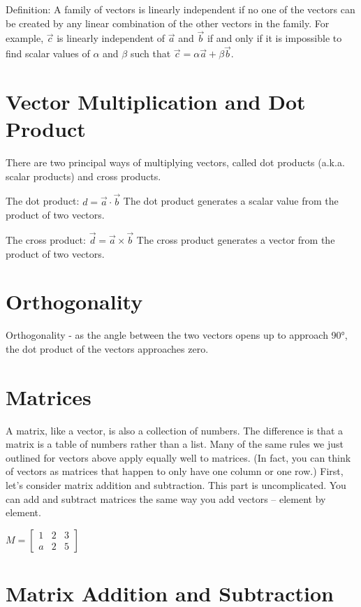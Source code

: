\documentclass{article}
\begin{document}
Definition: A family of vectors is linearly independent if no one of the vectors can be created by any linear combination of the other vectors in the family. For example, $\vec{c}$ is linearly independent of $\vec{a}$ and $\vec{b}$ if and only if it is impossible to find scalar values of $\alpha$ and $\beta$ such that $\vec{c} = \alpha\vec{a} + \beta\vec{b}$.

\section{Vector Multiplication and Dot Product}
There are two principal ways of multiplying vectors, called dot products (a.k.a. scalar products) and cross products.

The dot product: $d = \vec{a} \cdot \vec{b}$
The dot product generates a scalar value from the product of two vectors.

The cross product: $\vec{d} = \vec{a} \times \vec{b}$
The cross product generates a vector from the product of two vectors.

\section{Orthogonality}
Orthogonality - as the angle between the two vectors opens up to approach 90°, the dot product of the vectors approaches zero.

\section{Matrices} 
A matrix, like a vector, is also a collection of numbers. The difference is that a matrix is a table of numbers rather than a list. Many of the same rules we just outlined for vectors above apply equally well to matrices. (In fact, you can think of vectors as matrices that happen to only have one column or one row.) First, let's consider matrix addition and subtraction. This part is uncomplicated. You can add and subtract matrices the same way you add vectors – element by element.

$M = \begin{bmatrix}
 1 & 2 & 3 \\ 
 a & 2 & 5 
\end{bmatrix}$

\section{Matrix Addition and Subtraction}
\end{document}

